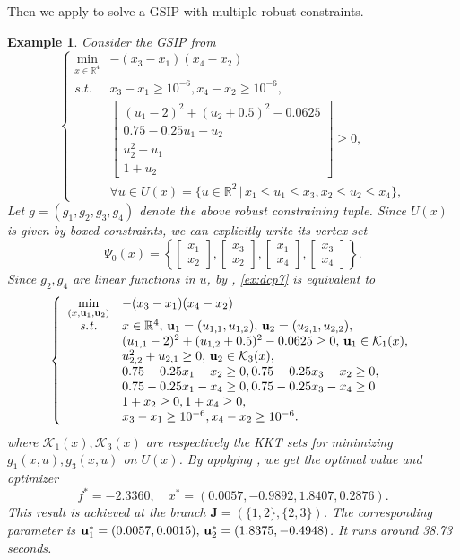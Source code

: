 \documentclass{amsart}
\theoremstyle{plain}
\newtheorem{exmp}[theorem]{Example}
\newcommand{\re}{\mathbb{R}}
\newcommand{\st}{\mathit{s.t.}}
\newcommand{\mc}[1]{\mathcal{#1}}
\newcommand{\bbm}{\begin{bmatrix}}
\newcommand{\ebm}{\end{bmatrix}}
\numberwithin{equation}{section}
\begin{document}
		
		Then we apply  to solve a GSIP with multiple robust constraints.
		\begin{exmp}\label{ex:dcp7}
			Consider the GSIP from \cite{Schwientek}
			\begin{equation}\label{ex:dcp7}
			\left\{\begin{array}{cl}
				\min\limits_{x\in\re^4} & -(x_3-x_1)(x_4-x_2)\\
				\st & x_3-x_1\ge 10^{-6}, x_4-x_2\ge 10^{-6},\\
				& \bbm (u_1-2)^2+(u_2+0.5)^2-0.0625\\
				0.75-0.25u_1-u_2\\
				u_2^2+u_1\\
				1+u_2\ebm\ge 0,\\
				& \forall u\in U(x) = \{ u\in\re^2\,\vert\, x_1\le u_1\le x_3, x_2\le u_2\le x_4\},
			\end{array}
			\right.
			\end{equation}
			Let $g = (g_1,g_2,g_3, g_4)$ denote the above robust constraining tuple.
			Since $U(x)$ is given by boxed constraints, we can explicitly write its vertex set
			\[
			\Psi_0(x) = \left\{ \bbm x_1\\x_2\ebm, \bbm x_3\\x_2\ebm,
			\bbm x_1\\x_4\ebm, \bbm x_3\\ x_4\ebm \right\}.
			\]
			Since $g_2,g_4$ are linear functions in $u$, by , 
			\eqref{ex:dcp7} is equivalent to 
			\begin{equation}\label{eq:refdcp7}
				\left\{\begin{array}{cl}
					\min\limits_{(x,{\bf u}_1,{\bf u}_2)} & -(x_3-x_1)(x_4-x_2)\\
					\st & x\in \re^4,\, {\bf u}_1 = (u_{1,1}, u_{1,2}),\, {\bf u}_{2} = (u_{2,1}, u_{2,2}),\\
					& (u_{1,1}-2)^2+(u_{1,2}+0.5)^2-0.0625\ge 0,\, {\bf u}_1\in\mc{K}_1(x),\\
					& 	u_{2,2}^2+u_{2,1}\ge 0,\, {\bf u}_2\in \mc{K}_3(x),\\
					& 0.75-0.25 x_1-x_2 \ge 0, 0.75-0.25x_3-x_2\ge 0,\\
					& 0.75-0.25x_1-x_4\ge 0, 0.75-0.25x_3-x_4\ge 0\\
					& 1+x_2\ge 0, 1+x_4\ge 0,\\
					& 	x_3-x_1\ge 10^{-6}, x_4-x_2\ge 10^{-6}.
				\end{array}
				\right.
			\end{equation}
			where $\mc{K}_1(x),\mc{K}_3(x)$ are respectively the KKT sets for 
			minimizing $g_1(x,u), g_3(x,u)$ on $U(x)$.
			By applying , we get the optimal value and optimizer 
			\[
			f^* = -2.3360, \quad x^* = (0.0057, -0.9892, 1.8407, 0.2876).
			\]
			This result is achieved at the branch $\mathbf{J} = (\{1,2\}, \{2,3\})$.
			The corresponding parameter is ${\bf u}_1^* = (0.0057,
			0.0015),\, {\bf u}_2^* = (1.8375, -0.4948)$.
			It runs around 38.73 seconds. 			
		\end{exmp}
		
\end{document}
